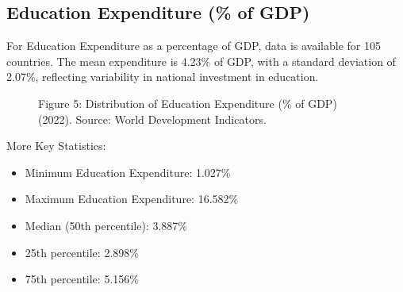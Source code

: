 \documentclass[
]{article}
\providecommand{\tightlist}{%
  \setlength{\itemsep}{0pt}\setlength{\parskip}{0pt}}\usepackage{longtable,booktabs,array}
\begin{document}
\subsection{Education Expenditure (\% of
GDP)}\label{education-expenditure-of-gdp}

For Education Expenditure as a percentage of GDP, data is available for
105 countries. The mean expenditure is 4.23\% of GDP, with a standard
deviation of 2.07\%, reflecting variability in national investment in
education.

\begin{figure}


\caption{\label{fig-education-expenditure-histogram}Figure 5:
Distribution of Education Expenditure (\% of GDP) (2022). Source: World
Development Indicators.}

\end{figure}%

More Key Statistics:

\begin{itemize}
\tightlist
\item
  Minimum Education Expenditure: 1.027\%
\item
  Maximum Education Expenditure: 16.582\%
\item
  Median (50th percentile): 3.887\%
\item
  25th percentile: 2.898\%
\item
  75th percentile: 5.156\%
\end{itemize}
\end{document}

